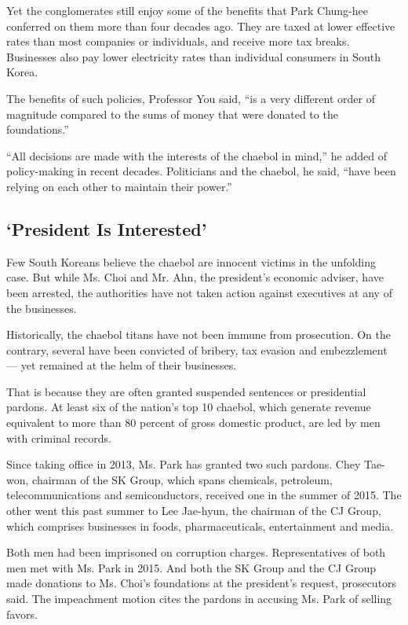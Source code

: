 Yet the conglomerates still enjoy some of the benefits that Park
Chung-hee conferred on them more than four decades ago. They are taxed
at lower effective rates than most companies or individuals, and receive
more tax breaks. Businesses also pay lower electricity rates than
individual consumers in South Korea.

The benefits of such policies, Professor You said, ``is a very different
order of magnitude compared to the sums of money that were donated to
the foundations.''

``All decisions are made with the interests of the chaebol in mind,'' he
added of policy-making in recent decades. Politicians and the chaebol,
he said, ``have been relying on each other to maintain their power.''

\hypertarget{president-is-interested}{%
\subsection{`President Is Interested'}\label{president-is-interested}}

Few South Koreans believe the chaebol are innocent victims in the
unfolding case. But while Ms. Choi and Mr. Ahn, the president's economic
adviser, have been arrested, the authorities have not taken action
against executives at any of the businesses.

Historically, the chaebol titans have not been immune from prosecution.
On the contrary, several have been convicted of bribery, tax evasion and
embezzlement --- yet remained at the helm of their businesses.

That is because they are often granted suspended sentences or
presidential pardons. At least six of the nation's top 10 chaebol, which
generate revenue equivalent to more than 80 percent of gross domestic
product, are led by men with criminal records.

Since taking office in 2013, Ms. Park has granted two such pardons. Chey
Tae-won, chairman of the SK Group, which spans chemicals, petroleum,
telecommunications and semiconductors, received one in the summer of
2015. The other went this past summer to Lee Jae-hyun, the chairman of
the CJ Group, which comprises businesses in foods, pharmaceuticals,
entertainment and media.

Both men had been imprisoned on corruption charges. Representatives of
both men met with Ms. Park in 2015. And both the SK Group and the CJ
Group made donations to Ms. Choi's foundations at the president's
request, prosecutors said. The impeachment motion cites the pardons in
accusing Ms. Park of selling favors.

